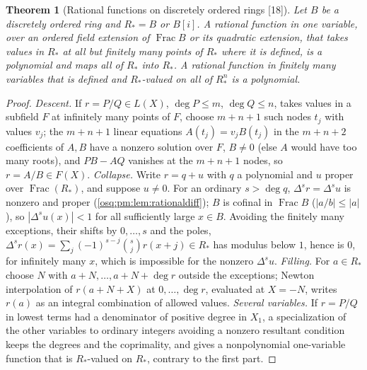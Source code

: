 \documentclass[11pt,letterpaper]{article}
\numberwithin{equation}{section}
\newtheorem{theorem}{Theorem}[section]
\theoremstyle{definition}
\theoremstyle{remark}
\theoremstyle{plain}
\newcommand{\Frac}{\operatorname{Frac}}
\newcommand{\src}[1]{\textup{\textsf{[#1]}}}
\begin{document}
\begin{theorem}[Rational functions on discretely ordered rings \src{18}]\label{osq:or:thm:rational}
Let $B$ be a discretely ordered ring and $R_*=B$ or $B[i]$. A rational function in one variable, over an ordered field extension of $\Frac B$ or its
quadratic extension, that takes values in $R_*$ at all but finitely many points of $R_*$ where it is defined, is a polynomial and maps all of $R_*$
into $R_*$. A rational function in finitely many variables that is defined and $R_*$-valued on all of $R_*^n$ is a polynomial.
\end{theorem}
\begin{proof}
\emph{Descent.} If $r=P/Q\in L(X)$, $\deg P\le m$, $\deg Q\le n$, takes values in a subfield $F$ at infinitely many points of $F$, choose $m+n+1$ such
nodes $t_j$ with values $v_j$; the $m+n+1$ linear equations $A(t_j)=v_jB(t_j)$ in the $m+n+2$ coefficients of $A,B$ have a nonzero solution over $F$,
$B\ne0$ (else $A$ would have too many roots), and $PB-AQ$ vanishes at the $m+n+1$ nodes, so $r=A/B\in F(X)$. \emph{Collapse.} Write $r=q+u$ with $q$
a polynomial and $u$ proper over $\Frac(R_*)$, and suppose $u\ne0$. For an ordinary $s>\deg q$, $\Delta^sr=\Delta^su$ is nonzero and proper
(\cref{osq:pm:lem:rationaldiff}); $B$ is cofinal in $\Frac B$ ($|a/b|\le|a|$), so $|\Delta^su(x)|<1$ for all sufficiently large $x\in B$. Avoiding the
finitely many exceptions, their shifts by $0,\dots,s$ and the poles, $\Delta^sr(x)=\sum_j(-1)^{s-j}\binom sjr(x+j)\in R_*$ has modulus below $1$, hence is
$0$, for infinitely many $x$, which is impossible for the nonzero $\Delta^su$. \emph{Filling.} For $a\in R_*$ choose $N$ with $a+N,\dots,a+N+\deg r$
outside the exceptions; Newton interpolation of $r(a+N+X)$ at $0,\dots,\deg r$, evaluated at $X=-N$, writes $r(a)$ as an integral combination of
allowed values. \emph{Several variables.} If $r=P/Q$ in lowest terms had a denominator of positive degree in $X_1$, a specialization of the other
variables to ordinary integers avoiding a nonzero resultant condition keeps the degrees and the coprimality, and gives a nonpolynomial one-variable
function that is $R_*$-valued on $R_*$, contrary to the first part.
\end{proof}
\end{document}
